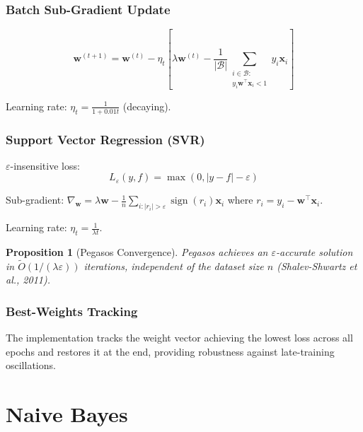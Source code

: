\documentclass[11pt,a4paper]{article}
\newtheorem{proposition}[theorem]{Proposition}
\theoremstyle{definition}
\theoremstyle{remark}
\DeclareMathOperator{\sign}{sign}
\begin{document}
\subsubsection*{Batch Sub-Gradient Update}
\begin{equation}
\mathbf{w}^{(t+1)} = \mathbf{w}^{(t)} - \eta_t\left[\lambda\mathbf{w}^{(t)} - \frac{1}{|\mathcal{B}|}\sum_{\substack{i \in \mathcal{B}:\\ y_i\mathbf{w}^\top\mathbf{x}_i < 1}} y_i\mathbf{x}_i\right]
\end{equation}

Learning rate: $\eta_t = \frac{1}{1 + 0.01t}$ (decaying).

\subsubsection*{Support Vector Regression (SVR)}

$\varepsilon$-insensitive loss:
\begin{equation}
L_\varepsilon(y, f) = \max(0, |y - f| - \varepsilon)
\end{equation}

Sub-gradient: $\nabla_\mathbf{w} = \lambda\mathbf{w} - \frac{1}{n}\sum_{i: |r_i| > \varepsilon} \sign(r_i)\mathbf{x}_i$ where $r_i = y_i - \mathbf{w}^\top\mathbf{x}_i$.

Learning rate: $\eta_t = \frac{1}{\lambda t}$.

\begin{proposition}[Pegasos Convergence]
Pegasos achieves an $\varepsilon$-accurate solution in $\tilde{O}(1/(\lambda\varepsilon))$ iterations, independent of the dataset size $n$ (Shalev-Shwartz et al., 2011).
\end{proposition}

\subsubsection*{Best-Weights Tracking}

The implementation tracks the weight vector achieving the lowest loss across all epochs and restores it at the end, providing robustness against late-training oscillations.


\section{Naive Bayes}
\end{document}

